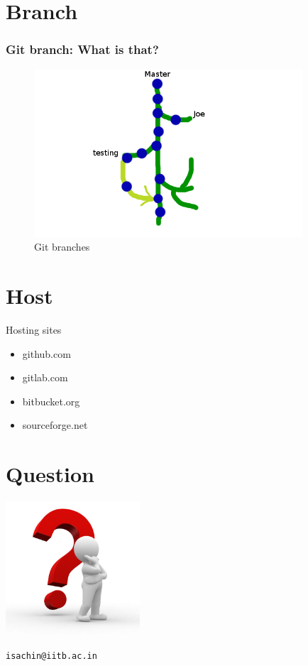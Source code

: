 \documentclass[bigger, presentation]{beamer}
\begin{document}
\section{Branch}
\label{sec-11}
\begin{frame}
\frametitle{Git branch: What is that?}
\label{sec-11-1}



  \begin{figure}[htb]
  \centering
  \includegraphics[width=10cm,angle=0]{./branch.png}
  \caption{\label{fig:branch}Git branches}
  \end{figure}
\end{frame}
\section{Host}
\label{sec-12}
\begin{frame}
\begin{block}{Hosting sites}
\label{sec-12-1-1}

\begin{itemize}
\item github.com
\item gitlab.com
\item bitbucket.org
\item sourceforge.net
\end{itemize}
     
\end{block}
\end{frame}
\section{Question}
\label{sec-13}
\begin{frame}[fragile]

   \includegraphics[width=5cm,angle=0]{./questions.png}
   

\begin{verbatim}
isachin@iitb.ac.in
\end{verbatim}
\end{frame}
\end{document}
